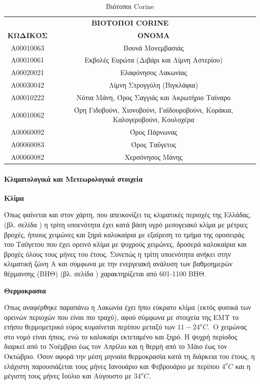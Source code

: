 \documentclass[12pt]{article}
\newcommand{\gr}{\selectlanguage{greek}}
\newcommand{\eng}{\selectlanguage{english}}
\begin{document}
	\begin{table}[H]
		\centering
		\begin{tabular}{|c|c|}
			\hline
			\multicolumn{2}{|c|}{\textbf{ΒΙΟΤΟΠΟΙ \eng CORINE \gr}} \\
			\textbf{ΚΩΔΙΚΟΣ} & \textbf{ΟΝΟΜΑ} \\ \hline
			Α00010063 & Βουνά Μονεμβασιάς \\ \hline
			Α00010061 & Εκβολές Ευρώτα (Διβάρι και Λίμνη Αστερίου) \\ \hline
			Α00020021 & Ελαφόνησος Λακωνίας \\ \hline
			Α00030042 & Λίμνη Στρογγύλη (Βιγκλάφια) \\ \hline
			Α00010222 & Νότια Μάνη, Όρος Σαγγιάς και Ακρωτήριο Ταίναρο \\ \hline
			Α00010062 & Όρη Γιδοβούνι, Χιονοβούνι, Γαϊδουροβούνι, Κοράκια, Καλογεροβούνι, Κουλοχέρα \\ \hline
			Α00060092 & Όρος Πάρνωνας \\ \hline
			Α00060083 & Όρος Ταΰγετος \\ \hline
			Α00060082 & Χερσόνησος Μάνης \\ \hline
		\end{tabular}
		\caption{Βιότοποι \eng Corine \gr}
		\label{The label}
	\end{table}
	
	\paragraph{Κλιματολογικά και Μετεωρολογικά στοιχεία}
	
	\textbf{Κλίμα}
	
	Όπως φαίνεται και στον χάρτη, που απεικονίζει τις κλιματικές περιοχές της Ελλάδας, (βλ. σελίδα \pageref{klimatikes}) η τρίτη υποενότητα έχει κατά βάση υγρό μεσογειακό κλίμα με μέτριες βροχές, ήπιους χειμώνες και ξηρά καλοκαίρια με εξαίρεση το τμήμα της οροσειράς του Ταΰγετου που έχει ορεινό κλίμα με ψυχρούς χειμώνες, δροσερά καλοκαίρια και βροχές όλους τους μήνες του έτους. Συνεπώς η τρίτη υποενότητα ανήκει στην κλιματική ζώνη Α και σύμφωνα με την ενεργειακή ανάλυση των βαθμοημερών θέρμανσης (ΒΗΘ) (βλ. σελίδα \pageref{bathmoimeres}) χαρακτηρίζεται από 601-1100 ΒΗΘ.
	
	\textbf{Θερμοκρασια}
	
	Όπως αναφέρθηκε παραπάνω η Λακωνία έχει ήπιο εύκρατο κλίμα (εκτός φυσικά των ορεινών περιοχών που είναι πιο τραχύ), αφού σύμφωνα με στοιχεία της ΕΜΥ το ετήσιο θερμομετρικό εύρος κυμαίνεται περίπου μεταξύ των $11-24^o C$. Ο χειμώνας στο νομό είναι ήπιος, ενώ το καλοκαίρι εκτεταμένο και ξηρό. Η ψυχρή περίοδος διαρκεί από το Νοέμβριο έως τον Απρίλιο και η θερμή από το Μάιο έως τον Οκτώβριο. Όσον αφορά την μέση μηνιαία θερμοκρασία κατά τη διάρκεια του έτους, η ελάχιστη παρουσιάζεται τους μήνες Ιανουάριο και Φεβρουάριο με περίπου $4^o C$ και η μέγιστη τους μήνες Ιούλιο και Αύγουστο με $34^o C$. 
	
\end{document}
